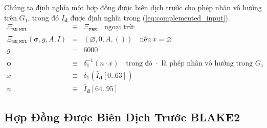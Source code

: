 \documentclass[9pt,oneside]{amsart}
\begin{document}
Chúng ta định nghĩa một hợp đồng được biên dịch trước cho phép nhân vô hướng trên $G_1$, trong đó $\bar I_{\mathbf{d}}$ được định nghĩa trong (\ref{eq:complemented_input}).
\begin{eqnarray}
\Xi_{\mathtt{BN\_MUL}}&\equiv&\Xi_{\mathtt{PRE}}\quad\text{ngoại trừ:}\\
\Xi_{\mathtt{BN\_MUL}}(\boldsymbol\sigma,g,A,I)&=&\left(\varnothing,0,A,()\right)\quad\text{nếu}\ x=\varnothing\\
g_{\mathrm{r}} &=& 6000\\
\mathbf{o}&\equiv&\delta_1^{-1}(n\cdot x)\quad\text{trong đó $\cdot$ là phép nhân vô hướng trong $G_1$}\\
x&\equiv&\delta_1\left(\bar I_{\mathbf{d}}[0..63]\right)\\
n&\equiv&\bar I_{\mathbf{d}}[64..95]
\end{eqnarray}

\subsection{Hợp Đồng Được Biên Dịch Trước BLAKE2}
\end{document}
